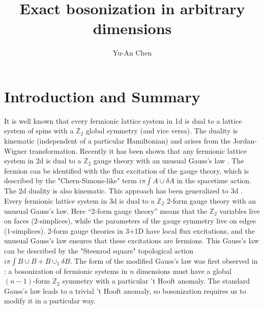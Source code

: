 \documentclass[12pt]{article}
\title{Exact bosonization in arbitrary dimensions}
\author[*]{Yu-An Chen}
\affil[*]{California Institute of Technology, Pasadena, CA 91125, USA}
\newcommand{\ZZ}{{\mathbb Z}}
\begin{document}
\maketitle
{}

\section{Introduction and Summary}

It is well known that every fermionic lattice system in 1d is dual to a lattice system of spins with a $\ZZ_2$ global symmetry (and vice versa). The duality is kinematic (independent of a particular Hamiltonian) and arises from the Jordan-Wigner transformation. Recently it has been shown that any fermionic lattice system in 2d is dual to a $\ZZ_2$ gauge theory with an unusual Gauss's law \cite{CKR18}. The fermion can be identified with the flux excitation of the gauge theory, which is described by the "Chern-Simons-like" term $ i \pi \int A \cup \delta A$ in the spacetime action. The 2d duality is also kinematic. This approach has been generalized to 3d \cite{CK18}. Every fermionic lattice system in 3d is dual to a $\ZZ_2$ 2-form gauge theory with an unusual Gauss's law. Here ``2-form gauge theory'' means that the $\ZZ_2$ variables live on faces ($2$-simplices), while the parameters of the gauge symmetry live on edges ($1$-simplices). 2-form gauge theories in 3+1D have local flux excitations, and the unusual Gauss's law ensures that these excitations are fermions. This Gauss's law can be described by the "Steenrod square" topological action $ i \pi \int B \cup B + B \cup_1 \delta B$. The form of the modified Gauss's law was first observed in \cite{GK16}: a bosonization of fermionic systems in $n$ dimensions must have a global $(n-1)$-form $\ZZ_2$ symmetry with a particular 't Hooft anomaly. The standard Gauss's law leads to a trivial 't Hooft anomaly, so bosonization requires us to modify it in a particular way.
\end{document}
